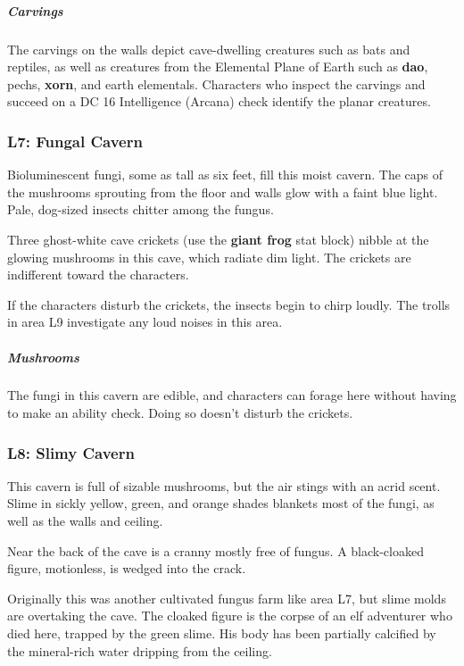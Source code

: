 \documentclass[10pt,a4paper,twoside,bg=print,twocolumn,openany,nodeprecatedcode]{dndbook}
\begin{document}
\subparagraph{Carvings}
The carvings on the walls depict cave-dwelling creatures such as bats and reptiles, as well as creatures from the Elemental Plane of Earth such as \textbf{dao}, pechs, \textbf{xorn}, and earth elementals. Characters who inspect the carvings and succeed on a DC 16 Intelligence (Arcana) check identify the planar creatures.

\subsubsection{L7: Fungal Cavern}
\begin{DndReadAloud}{}
Bioluminescent fungi, some as tall as six feet, fill this moist cavern. The caps of the mushrooms sprouting from the floor and walls glow with a faint blue light. Pale, dog-sized insects chitter among the fungus.

\end{DndReadAloud}

Three ghost-white cave crickets (use the \textbf{giant frog} stat block) nibble at the glowing mushrooms in this cave, which radiate dim light. The crickets are indifferent toward the characters.

If the characters disturb the crickets, the insects begin to chirp loudly. The trolls in area L9 investigate any loud noises in this area.

\subparagraph{Mushrooms}
The fungi in this cavern are edible, and characters can forage here without having to make an ability check. Doing so doesn't disturb the crickets.

\subsubsection{L8: Slimy Cavern}
\begin{DndReadAloud}{}
This cavern is full of sizable mushrooms, but the air stings with an acrid scent. Slime in sickly yellow, green, and orange shades blankets most of the fungi, as well as the walls and ceiling.

Near the back of the cave is a cranny mostly free of fungus. A black-cloaked figure, motionless, is wedged into the crack.

\end{DndReadAloud}

Originally this was another cultivated fungus farm like area L7, but slime molds are overtaking the cave. The cloaked figure is the corpse of an elf adventurer who died here, trapped by the green slime. His body has been partially calcified by the mineral-rich water dripping from the ceiling.
\end{document}
